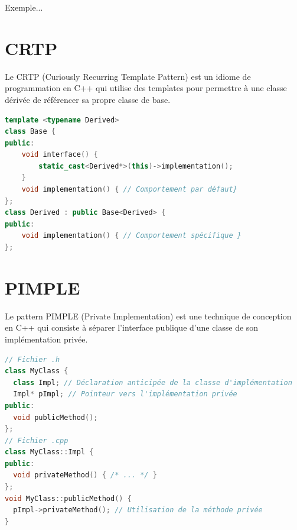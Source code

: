 \documentclass[9pt]{extarticle}
\begin{document}
\begin{multicols*}{3}
Exemple...

\section*{CRTP}
Le CRTP (Curiously Recurring Template Pattern) est un idiome de programmation en C++ qui utilise des templates pour permettre à une classe dérivée de référencer sa propre classe de base.

\begin{lstlisting}[language=C++]
template <typename Derived>
class Base {
public:
    void interface() {
        static_cast<Derived*>(this)->implementation();
    }
    void implementation() { // Comportement par défaut}
};
class Derived : public Base<Derived> {
public:
    void implementation() { // Comportement spécifique }
};
\end{lstlisting}

\section*{PIMPLE}
Le pattern PIMPLE (Private Implementation) est une technique de conception en C++ qui consiste à séparer l'interface publique d'une classe de son implémentation privée.

\begin{lstlisting}[language=C++]
// Fichier .h
class MyClass {
  class Impl; // Déclaration anticipée de la classe d'implémentation
  Impl* pImpl; // Pointeur vers l'implémentation privée
public:
  void publicMethod();
};
// Fichier .cpp
class MyClass::Impl {
public:
  void privateMethod() { /* ... */ }
};
void MyClass::publicMethod() {
  pImpl->privateMethod(); // Utilisation de la méthode privée
}
\end{lstlisting}



\end{multicols*}
\end{document}
